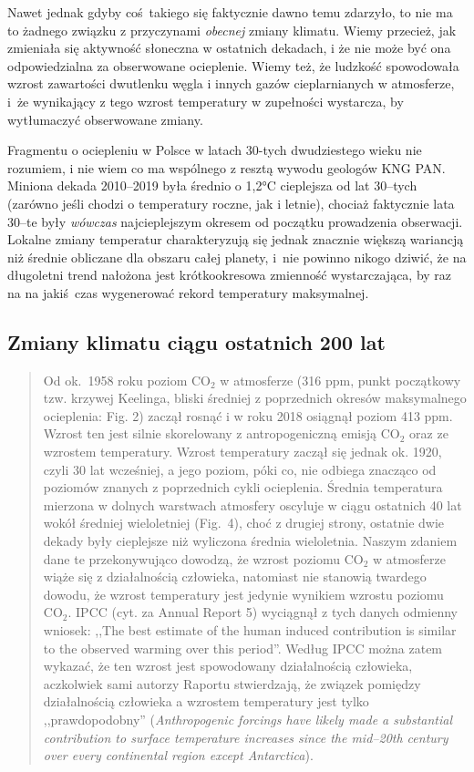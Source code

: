 \documentclass[12pt]{article}
\begin{document}
Nawet jednak gdyby coś takiego się faktycznie dawno temu zdarzyło, to nie ma to żadnego związku z przyczynami \emph{obecnej} zmiany klimatu. Wiemy przecież, jak zmieniała się aktywność słoneczna w ostatnich dekadach, i że nie może być ona odpowiedzialna za obserwowane ocieplenie. Wiemy też, że ludzkość spowodowała wzrost zawartości dwutlenku węgla i innych gazów cieplarnianych w atmosferze, i~że wynikający z tego wzrost temperatury w zupełności wystarcza, by wytłumaczyć obserwowane zmiany.

Fragmentu o ociepleniu w Polsce w latach 30-tych dwudziestego wieku nie rozumiem, i nie wiem co ma wspólnego z resztą wywodu geologów KNG PAN. Miniona dekada 2010--2019 była średnio o 1{,}2\si{\celsius} cieplejsza od lat 30--tych (zarówno jeśli chodzi o temperatury roczne, jak i letnie), chociaż faktycznie lata 30--te były \emph{wówczas} najcieplejszym okresem od początku prowadzenia obserwacji. Lokalne zmiany temperatur charakteryzują się jednak znacznie większą wariancją niż średnie obliczane dla obszaru całej planety, i~nie powinno nikogo dziwić, że na długoletni trend nałożona jest krótkookresowa zmienność wystarczająca, by raz na na jakiś czas wygenerować rekord temperatury maksymalnej.

\newpage

\subsection*{Zmiany klimatu ciągu ostatnich 200 lat}

\begin{quotation}
	Od ok.~1958 roku poziom CO$_2$ w atmosferze (316 ppm, punkt początkowy tzw. krzywej Keelinga, bliski średniej z poprzednich okresów maksymalnego ocieplenia: Fig. 2) zaczął rosnąć i w roku 2018 osiągnął poziom 413 ppm. Wzrost ten jest silnie skorelowany z antropogeniczną emisją CO$_2$ oraz ze wzrostem temperatury. Wzrost temperatury zaczął się jednak ok. 1920, czyli 30 lat wcześniej, a jego poziom, póki co, nie odbiega znacząco od poziomów znanych z poprzednich cykli ocieplenia. Średnia temperatura mierzona w dolnych warstwach atmosfery oscyluje w ciągu ostatnich 40 lat wokół średniej wieloletniej (Fig.~4), choć z drugiej strony, ostatnie dwie dekady były cieplejsze niż wyliczona średnia wieloletnia. Naszym zdaniem dane te przekonywująco dowodzą, że wzrost poziomu CO$_2$ w atmosferze wiąże się z działalnością człowieka, natomiast nie stanowią twardego dowodu, że wzrost temperatury jest jedynie wynikiem wzrostu poziomu CO$_2$. IPCC (cyt. za Annual Report 5) wyciągnął z tych danych odmienny wniosek: ,,The best estimate of the human induced contribution is similar to the observed warming over this period''. Według IPCC można zatem wykazać, że ten wzrost jest spowodowany działalnością człowieka, aczkolwiek sami autorzy Raportu stwierdzają, że związek pomiędzy działalnością człowieka a wzrostem temperatury jest tylko ,,prawdopodobny'' (\emph{Anthropogenic forcings have likely made a substantial contribution to surface temperature increases since the mid--20th century over every continental region except Antarctica}).
\end{quotation}
\end{document}
